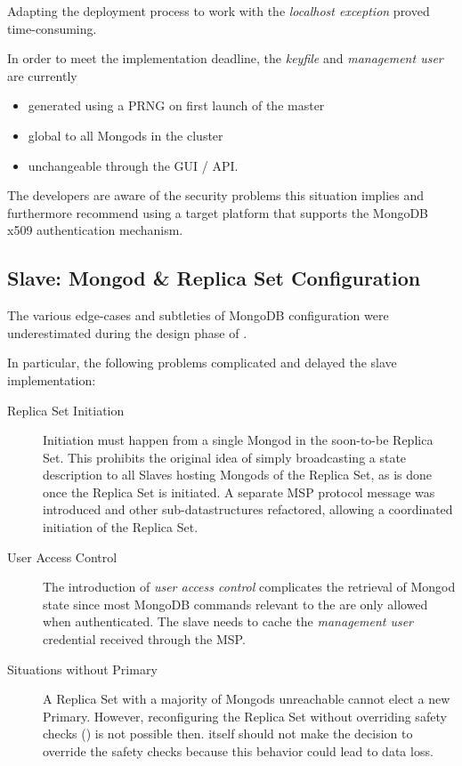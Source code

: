 Adapting the deployment process to work with the \textit{localhost exception} proved time-consuming.

In order to meet the implementation deadline, the \textit{keyfile} and \textit{management user} are currently

\begin{itemize}
  \item generated using a PRNG on first launch of the master
  \item global to all Mongods in the cluster
  \item unchangeable through the GUI / API.
\end{itemize}

The developers are aware of the security problems this situation implies and furthermore recommend using a target platform that supports
the MongoDB x509 authentication mechanism. %

\subsection{Slave: Mongod \& Replica Set Configuration}

The various edge-cases and subtleties of MongoDB configuration were underestimated during the design phase of \mamid.

In particular, the following problems complicated and delayed the slave implementation:
\begin{description}
\item[Replica Set Initiation] Initiation must happen from a single Mongod in the soon-to-be Replica Set.
     This prohibits the original idea of simply broadcasting a state description to all Slaves hosting Mongods of the Replica Set,
        as is done once the Replica Set is initiated.
     A separate MSP protocol message  was introduced and other sub-datastructures refactored, allowing
        a coordinated initiation of the Replica Set.
\item[User Access Control] The introduction of \textit{user access control} complicates the retrieval of Mongod state since most MongoDB
        commands relevant to the  are only allowed when authenticated.
        The slave needs to cache the \textit{management user} credential received through the MSP.
\item[Situations without Primary] A Replica Set with a majority of Mongods unreachable cannot elect a new Primary.
        However, reconfiguring the Replica Set without overriding safety checks () is not possible then.
        \mamid itself should not make the decision to override the safety checks because this behavior could lead to data loss.
\end{description}

